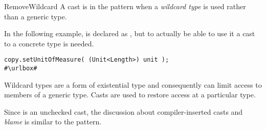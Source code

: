 \begin{pattern}{RemoveWildcard}
A cast is in the \thisp{} pattern when a \emph{wildcard type} is used rather than a generic type.


\instances{}
In the following example,%
\def\urlvar{http://bit.ly/eclipse_jetty_project_2WMI0Ld}
 is declared as ,
but to actually be able to use it a cast to a concrete type is needed.

\begin{verbatim}
copy.setUnitOfMeasure( (Unit<Length>) unit );
#\urlbox#
\end{verbatim}


\issues{}
Wildcard types are a form of existential type and consequently can limit
access to members of a generic type.
Casts are used to restore access at a particular type.

Since \thisp{} is an unchecked cast,
the discussion about compiler-inserted casts and \emph{blame} is similar to the  pattern.

\end{pattern}
